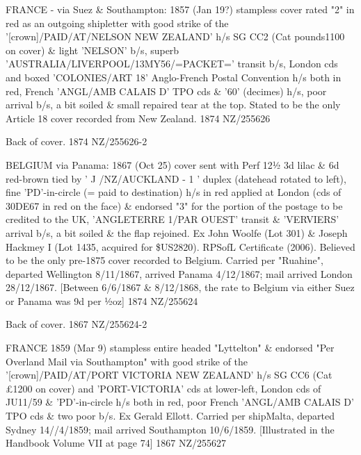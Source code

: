 \documentclass[justified]{tufte-book}
\begin{document}
%
{FRANCE - via Suez \& Southampton: 1857 (Jan 19?) stampless cover rated "2" in red as an outgoing shipletter with good strike of the '[crown]/PAID/AT/NELSON NEW ZEALAND' h/s SG CC2 (Cat pounds{1100} on cover) \& light 'NELSON' b/s, superb 'AUSTRALIA/LIVERPOOL/13MY56/=PACKET=' transit b/s, London cds and boxed 'COLONIES/ART 18' Anglo-French Postal Convention h/s both in red, French 'ANGL/AMB CALAIS D' TPO cds \& '60' (decimes) h/s, poor arrival b/s, a bit soiled \& small repaired tear at the top. Stated to be the only Article 18 cover recorded from New Zealand.}%
{1874}%
{NZ/255626}%
{}%
{}
{}%
{}

%
{Back of cover.}%
{1874}%
{NZ/255626-2}%
{}%
{}
{}%
{}

\pagebreak
{}%
{BELGIUM via Panama: 1867 (Oct 25) cover sent with Perf 12½ 3d lilac \& 6d red-brown tied by ' J /NZ/AUCKLAND - 1 ' duplex (datehead rotated to left), fine 'PD'-in-circle (= paid to destination) h/s in red applied at London (cds of 30DE67 in red on the face) \& endorsed "3" for the portion of the postage to be credited to the UK, 'ANGLETERRE 1/PAR OUEST' transit \& 'VERVIERS' arrival b/s, a bit soiled \& the flap rejoined. Ex John Woolfe (Lot 301) \& Joseph Hackmey I (Lot 1435, acquired for \$US2820). RPSofL Certificate (2006). Believed to be the only pre-1875 cover recorded to Belgium. Carried per "Ruahine", departed Wellington 8/11/1867, arrived Panama 4/12/1867; mail arrived London 28/12/1867. [Between 6/6/1867 \& 8/12/1868, the rate to Belgium via either Suez or Panama was 9d per ½oz]}%
{1874}%
{NZ/255624}%
{}%
{}
{}%
{}

%
{Back of cover.}%
{1867}%
{NZ/255624-2}%
{}%
{}
{}%
{}

%
{FRANCE 1859 (Mar 9) stampless entire headed "Lyttelton" \& endorsed "Per Overland Mail via Southampton" with good strike of the '[crown]/PAID/AT/PORT VICTORIA NEW ZEALAND' h/s SG CC6 (Cat £1200 on cover) and 'PORT-VICTORIA' cds at lower-left, London cds of JU11/59 \& 'PD'-in-circle h/s both in red, poor French 'ANGL/AMB CALAIS D' TPO cds \& two poor b/s. Ex Gerald Ellott. Carried per ship{Malta}, departed Sydney 14//4/1859; mail arrived Southampton 10/6/1859. [Illustrated in the Handbook Volume VII at page 74]}%
{1867}%
{NZ/255627}%
{}%
{}
{}%
{}
\end{document}
